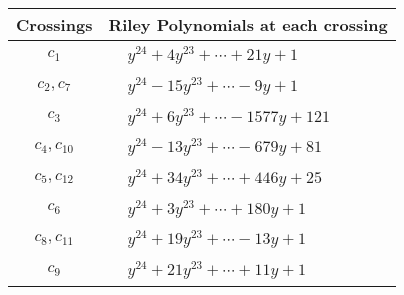 \documentclass[1p]{elsarticle_modified}
\theoremstyle{definition}
\begin{document}
\begin{tabular}{m{50pt}|m{274pt}}
Crossings & \hspace{64pt}Riley Polynomials at each crossing \\
\hline $$\begin{aligned}c_{1}\end{aligned}$$&$\begin{aligned}
&y^{24}+4 y^{23}+\cdots+21 y+1
\end{aligned}$\\
\hline $$\begin{aligned}c_{2},c_{7}\end{aligned}$$&$\begin{aligned}
&y^{24}-15 y^{23}+\cdots-9 y+1
\end{aligned}$\\
\hline $$\begin{aligned}c_{3}\end{aligned}$$&$\begin{aligned}
&y^{24}+6 y^{23}+\cdots-1577 y+121
\end{aligned}$\\
\hline $$\begin{aligned}c_{4},c_{10}\end{aligned}$$&$\begin{aligned}
&y^{24}-13 y^{23}+\cdots-679 y+81
\end{aligned}$\\
\hline $$\begin{aligned}c_{5},c_{12}\end{aligned}$$&$\begin{aligned}
&y^{24}+34 y^{23}+\cdots+446 y+25
\end{aligned}$\\
\hline $$\begin{aligned}c_{6}\end{aligned}$$&$\begin{aligned}
&y^{24}+3 y^{23}+\cdots+180 y+1
\end{aligned}$\\
\hline $$\begin{aligned}c_{8},c_{11}\end{aligned}$$&$\begin{aligned}
&y^{24}+19 y^{23}+\cdots-13 y+1
\end{aligned}$\\
\hline $$\begin{aligned}c_{9}\end{aligned}$$&$\begin{aligned}
&y^{24}+21 y^{23}+\cdots+11 y+1
\end{aligned}$\\
\hline
\end{tabular}\\~\\
\end{document}
